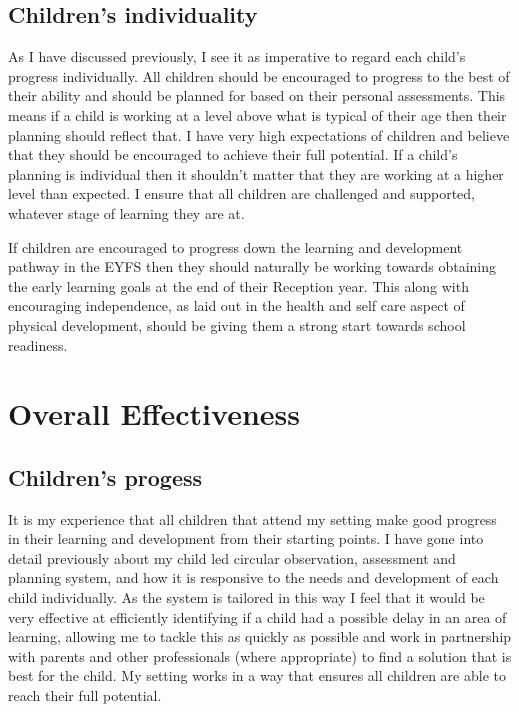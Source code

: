 \documentclass[10pt,a4paper]{report}
\begin{document}
\section{Children's individuality}

As I have discussed previously, I see it as imperative to regard each child's progress individually. All children should be encouraged to progress to the best of their ability and should be planned for based on their personal assessments. This means if a child is working at a level above what is typical of their age then their planning should reflect that. I have very high expectations of children and believe that they should be encouraged to achieve their full potential. If a child's planning is individual then it shouldn't matter that they are working at a higher level than expected. I ensure that all children are challenged and supported, whatever stage of learning they are at.

If children are encouraged to progress down the learning and development pathway in the EYFS then they should naturally be working towards obtaining the early learning goals at the end of their Reception year. This along with encouraging independence, as laid out in the health and self care aspect of physical development, should be giving them a strong start towards school readiness.

\chapter{Overall Effectiveness}

\section{Children's progess}

It is my experience that all children that attend my setting make good progress in their learning and development from their starting points. I have gone into detail previously about my child led circular observation, assessment and planning system, and how it is responsive to the needs and development of each child individually. As the system is tailored in this way I feel that it would be very effective at efficiently identifying if a child had a possible delay in an area of learning, allowing me to tackle this as quickly as possible and work in partnership with parents and other professionals (where appropriate) to find a solution that is best for the child. My setting works in a way that ensures all children are able to reach their full potential. 
\end{document}
